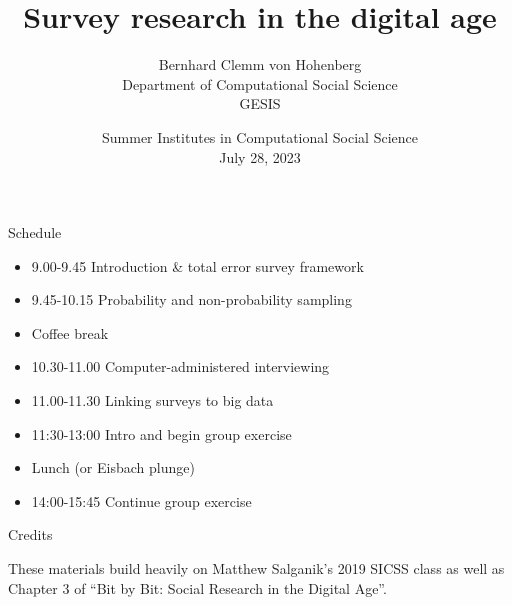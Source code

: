 \documentclass[aspectratio=169]{beamer}
\title[]{Survey research in the digital age}
\author[]{Bernhard Clemm von Hohenberg\\Department of Computational Social Science\\GESIS}
\date[]{Summer Institutes in Computational Social Science\\July 28, 2023}
\begin{document}
\frame{\titlepage}

\begin{frame}{Schedule}

\vspace{0.5em}
\begin{itemize}
\item 9.00-9.45 Introduction \& total error survey framework
\item 9.45-10.15 Probability and non-probability sampling
\vspace{0.5em}
\item Coffee break
\vspace{0.5em}
\item 10.30-11.00 Computer-administered interviewing
\item 11.00-11.30 Linking surveys to big data
\item 11:30-13:00 Intro and begin group exercise
\vspace{0.5em}
\item Lunch (or Eisbach plunge)
\vspace{0.5em}
\item 14:00-15:45 Continue group exercise
\end{itemize}

\end{frame}
\begin{frame}{Credits}

These materials build heavily on Matthew Salganik's 2019 SICSS class as well as Chapter 3 of ``Bit by Bit: Social Research in the Digital Age''.

\end{frame}
\end{document}
